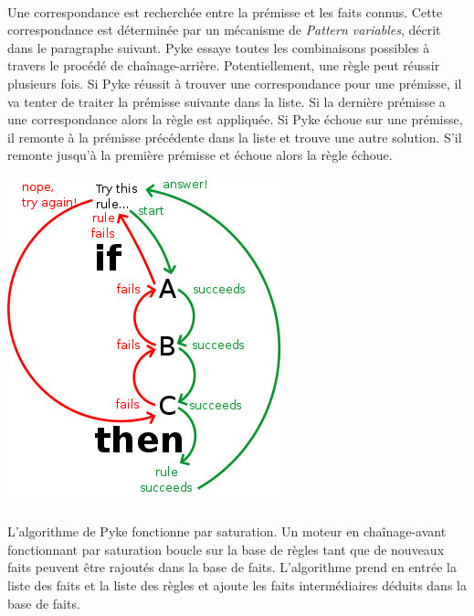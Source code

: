 \documentclass {report}
\begin{document}
\begin{multicols}{2}

\paragraph{}
Une correspondance est recherchée entre la prémisse et les faits connus. Cette correspondance est déterminée par un mécanisme de \textit{Pattern variables}, décrit dans le paragraphe suivant. Pyke essaye toutes les combinaisons possibles à travers le procédé de chaînage-arrière. Potentiellement, une règle peut réussir plusieurs fois. Si Pyke réussit à trouver une correspondance pour une prémisse, il va tenter de traiter la prémisse suivante dans la liste. Si la dernière prémisse a une correspondance alors la règle est appliquée. Si Pyke échoue sur une prémisse, il remonte à la prémisse précédente dans la liste et trouve une autre solution. S'il remonte jusqu'à la première prémisse et échoue alors la règle échoue.

\begin{center}
\includegraphics[scale=0.7]{if-then.png}
\end{center}

\end{multicols}
\paragraph{}
L'algorithme de Pyke fonctionne par saturation. Un moteur en chaînage-avant fonctionnant par saturation boucle sur la base de règles tant que de nouveaux faits peuvent être rajoutés dans la base de faits. L'algorithme prend en entrée la liste des faits et la liste des règles et ajoute les faits intermédiaires déduits dans la base de faits.
\end{document}
